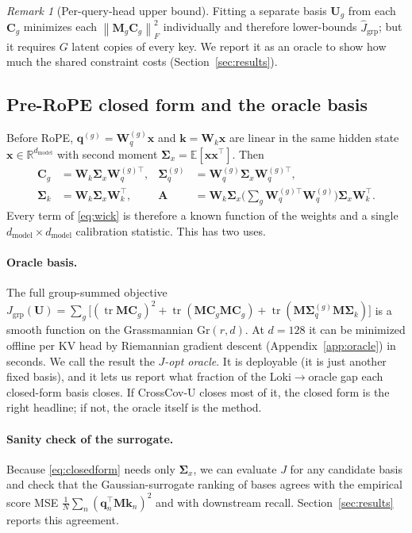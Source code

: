 \documentclass[10pt]{article}
\newcommand{\R}{\mathbb{R}}
\newcommand{\E}{\mathbb{E}}
\newcommand{\tr}{\operatorname{tr}}
\newcommand{\norm}[1]{\left\lVert #1 \right\rVert}
\newcommand{\fro}[1]{\norm{#1}_F}
\newcommand{\bq}{\mathbf{q}}
\newcommand{\bk}{\mathbf{k}}
\newcommand{\bx}{\mathbf{x}}
\newcommand{\bU}{\mathbf{U}}
\newcommand{\bW}{\mathbf{W}}
\newcommand{\bC}{\mathbf{C}}
\newcommand{\bM}{\mathbf{M}}
\newcommand{\Sq}{\bm{\Sigma}_q}
\newcommand{\Sk}{\bm{\Sigma}_k}
\newcommand{\Sx}{\bm{\Sigma}_x}
\newcommand{\method}{CrossCov-U}
\theoremstyle{plain}
\theoremstyle{definition}
\theoremstyle{remark}
\newtheorem{remark}[theorem]{Remark}
\begin{document}
\begin{remark}[Per-query-head upper bound]
Fitting a separate basis $\bU_g$ from each $\bC_g$ minimizes each
$\fro{\bM_g\bC_g}^2$ individually and therefore lower-bounds
$\hat J_{\mathrm{grp}}$; but it requires $G$ latent copies of every key. We
report it as an oracle to show how much the shared constraint costs
(Section~\ref{sec:results}).
\end{remark}

\subsection{Pre-RoPE closed form and the oracle basis}
\label{sec:oracle}

Before RoPE, $\bq^{(g)}=\bW_q^{(g)}\bx$ and $\bk=\bW_k\bx$ are linear in the
same hidden state $\bx\in\R^{d_{\mathrm{model}}}$ with second moment
$\Sx=\E[\bx\bx^\top]$. Then
\begin{equation}
  \label{eq:closedform}
  \begin{aligned}
  \bC_g&=\bW_k\Sx\bW_q^{(g)\top},&
  \Sq^{(g)}&=\bW_q^{(g)}\Sx\bW_q^{(g)\top},\\
  \Sk&=\bW_k\Sx\bW_k^\top,&
  \mathbf{A}&=\bW_k\Sx\Big(\sum_g\bW_q^{(g)\top}\bW_q^{(g)}\Big)\Sx\bW_k^\top .
  \end{aligned}
\end{equation}
Every term of \eqref{eq:wick} is therefore a known function of the weights
and a single $d_{\mathrm{model}}\times d_{\mathrm{model}}$ calibration
statistic. This has two uses.

\paragraph{Oracle basis.}
The full group-summed objective
$J_{\mathrm{grp}}(\bU)=\sum_g\big[(\tr\bM\bC_g)^2+\tr(\bM\bC_g\bM\bC_g)+\tr(\bM\Sq^{(g)}\bM\Sk)\big]$
is a smooth function on the Grassmannian $\mathrm{Gr}(r,d)$. At $d=128$ it
can be minimized offline per KV head by Riemannian gradient descent
(Appendix~\ref{app:oracle}) in seconds. We call the result the
\emph{$J$-opt oracle}. It is deployable (it is just another fixed basis), and
it lets us report what fraction of the Loki$\to$oracle gap each closed-form
basis closes. If \method{} closes most of it, the closed form is the right
headline; if not, the oracle itself is the method.

\paragraph{Sanity check of the surrogate.}
Because \eqref{eq:closedform} needs only $\Sx$, we can evaluate $J$ for any
candidate basis and check that the Gaussian-surrogate ranking of bases agrees
with the empirical score MSE $\frac1N\sum_n(\bq_n^\top\bM\bk_n)^2$ and with
downstream recall. Section~\ref{sec:results} reports this agreement.
\end{document}
